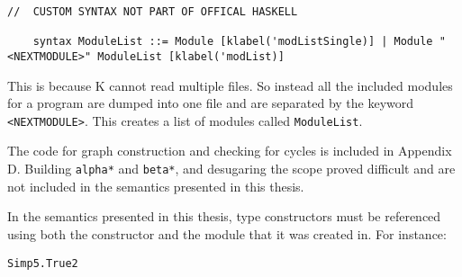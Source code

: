 \begin{lstlisting}
//  CUSTOM SYNTAX NOT PART OF OFFICAL HASKELL

    syntax ModuleList ::= Module [klabel('modListSingle)] | Module "<NEXTMODULE>" ModuleList [klabel('modList)]
\end{lstlisting}

This is because K cannot read multiple files. So instead all the included modules for a program are dumped into one file and are separated by the keyword \texttt{<NEXTMODULE>}.
This creates a list of modules called \texttt{ModuleList}.

The code for graph construction and checking for cycles is included in Appendix D. Building \texttt{alpha*} and \texttt{beta*}, and desugaring the scope proved difficult and are not included in the semantics presented in this thesis.

In the semantics presented in this thesis, type constructors must be referenced using both the constructor and the module that it was created in. For instance:

\begin{lstlisting}
Simp5.True2
\end{lstlisting}